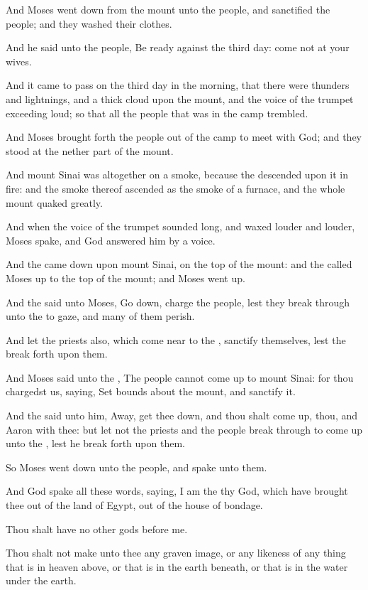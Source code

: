 \Verse And Moses went down from the mount unto the people, and sanctified the people; and they washed their clothes.

\Verse And he said unto the people, Be ready against the third day: come not at your wives.

\Verse And it came to pass on the third day in the morning, that there were thunders and lightnings, and a thick cloud upon the mount, and the voice of the trumpet exceeding loud; so that all the people that was in the camp trembled.

\Verse And Moses brought forth the people out of the camp to meet with God; and they stood at the nether part of the mount.

\Verse And mount Sinai was altogether on a smoke, because the \LORD descended upon it in fire: and the smoke thereof ascended as the smoke of a furnace, and the whole mount quaked greatly.

\Verse And when the voice of the trumpet sounded long, and waxed louder and louder, Moses spake, and God answered him by a voice.

\Verse And the \LORD came down upon mount Sinai, on the top of the mount: and the \LORD called Moses up to the top of the mount; and Moses went up.

\Verse And the \LORD said unto Moses, Go down, charge the people, lest they break through unto the \LORD to gaze, and many of them perish.

\Verse And let the priests also, which come near to the \LORD, sanctify themselves, lest the \LORD break forth upon them.

\Verse And Moses said unto the \LORD, The people cannot come up to mount Sinai: for thou chargedst us, saying, Set bounds about the mount, and sanctify it.

\Verse And the \LORD said unto him, Away, get thee down, and thou shalt come up, thou, and Aaron with thee: but let not the priests and the people break through to come up unto the \LORD, lest he break forth upon them.

\Verse So Moses went down unto the people, and spake unto them.

\Chapter
\Verse And God spake all these words, saying, \Verse I am the \LORD thy God, which have brought thee out of the land of Egypt, out of the house of bondage.

\Verse Thou shalt have no other gods before me.

\Verse Thou shalt not make unto thee any graven image, or any likeness of any thing that is in heaven above, or that is in the earth beneath, or that is in the water under the earth.

